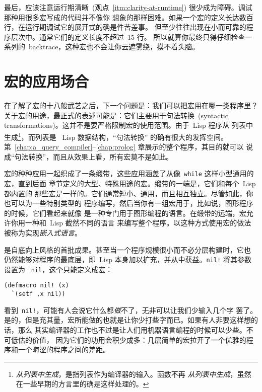 最后，应该注意运行期清晰~(观点~\ref{itm:clarity-at-runtime}) 很少成为障碍。调试那种用很多宏写成的代码并不像你
想象的那样困难。如果一个宏的定义长达数百行，在运行期调试它的展开式的确是件苦差事。
但至少\utility{}往往出现在小而可靠的程序层次中。通常它们的定义长度不超过~15 行。
所以就算你最终只得仔细检查一系列的~backtrace，这种宏也不会让你云遮雾绕，摸不着头脑。

\section{宏的应用场合}
\label{sec:applications_for_macros}

在了解了宏的十八般武艺之后，下一个问题是：我们可以把宏用在哪一类程序里？
关于宏的用途，最正式的表述可能是：它们主要用于句法转换~(syntactic
transformations)。这并不是要严格限制宏的使用范围。由于~Lisp 程序从
列表中生成\footnote{\emph{从列表中生成}，是指列表作为编译器的输入。函数不再
\emph{从列表中生成}，虽然在一些早期的方言里的确是这样处理的。}，而列表是
~Lisp 数据结构，``句法转换'' 的确有很大的发挥空间。
第~\ref{chap:a_query_compiler}--\ref{chap:prolog} 章展示的整个程序，其目的就可以
说成``句法转换''，而且从效果上看，所有宏莫不是如此。

宏的种种应用一起织成了一条缎带，这些应用涵盖了从像~\texttt{while} 这样小型通用的宏，直到后面
章节定义的大型、特殊用途的宏。缎带的一端是\emph{\utility{}}，它们和每个~Lisp 都内置的
那些宏是一样的。它们通常短小、通用，而且相互独立。尽管如此，你也可以为一些特别类型的
程序编写\utility{}，然后当你有一组宏用于，比如说，图形程序的时候，它们看起来就像
是一种专门用于图形编程的语言。在缎带的远端，宏允许你用一种和~Lisp 截然不同的语言
来编写整个程序。以这种方式使用宏的做法被称为实现\emph{嵌入式语言}。

\utility{}是自底向上风格的首批成果。甚至当一个程序规模很小而不必分层构建时，它也
仍然能够对程序的最底层，即~Lisp 本身加以扩充，并从中获益。\verb|nil!| 将其参数设置为
~\texttt{nil}，这个\utility{}只能定义成宏：
\begin{lstlisting}
(defmacro nil! (x)
  `(setf ,x nil))
\end{lstlisting}
看到~\texttt{nil!}，可能有人会说它什么都\emph{做}不了，无非可以让我们少输入几个字
罢了。是的，但是充其量，宏所能做的也就是让你少打些字而已。如果有人非要这样想的话，那么
其实编译器的工作也不过是让人们用机器语言编程的时候可以少些。不可低估\utility{}的价值，
因为它们的功用会积少成多：几层简单的宏拉开了一个优雅的程序和一个晦涩的程序之间的差距。

